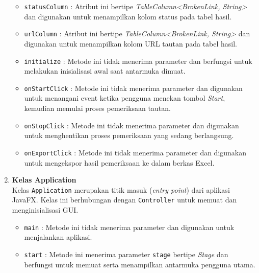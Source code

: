 \begin{enumerate}
\begin{itemize}
        \item \texttt{statusColumn} : Atribut ini bertipe \textit{TableColumn<BrokenLink, String>} dan digunakan untuk menampilkan kolom status pada tabel hasil.
        
        \item \texttt{urlColumn} : Atribut ini bertipe \textit{TableColumn<BrokenLink, String>} dan digunakan untuk menampilkan kolom URL tautan pada tabel hasil.
        
        \item \texttt{initialize} : Metode ini tidak menerima parameter dan berfungsi untuk melakukan inisialisasi awal saat antarmuka dimuat.
        
        \item \texttt{onStartClick} : Metode ini tidak menerima parameter dan digunakan untuk menangani event ketika pengguna menekan tombol \textit{Start}, kemudian memulai proses pemeriksaan tautan.
        
        \item \texttt{onStopClick} : Metode ini tidak menerima parameter dan digunakan untuk menghentikan proses pemeriksaan yang sedang berlangsung.
        
        \item \texttt{onExportClick} : Metode ini tidak menerima parameter dan digunakan untuk mengekspor hasil pemeriksaan ke dalam berkas Excel.
    \end{itemize}

    \item \textbf{Kelas Application}\\
    Kelas \texttt{Application} merupakan titik masuk (\textit{entry point}) dari aplikasi JavaFX. Kelas ini berhubungan dengan \texttt{Controller} untuk memuat dan menginisialisasi GUI.
    \begin{itemize}
        \item \texttt{main} : Metode ini tidak menerima parameter dan digunakan untuk menjalankan aplikasi.
        \item \texttt{start} : Metode ini menerima parameter \texttt{stage} bertipe \textit{Stage} dan berfungsi untuk memuat serta menampilkan antarmuka pengguna utama.
    \end{itemize}


\end{enumerate}

